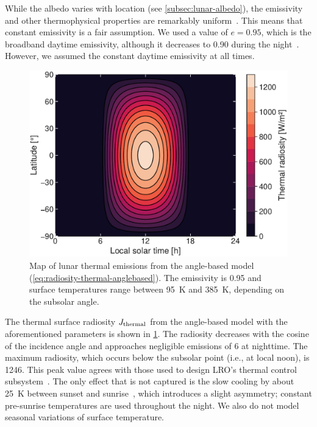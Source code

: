 While the albedo varies with location (see \cref{subsec:lunar-albedo}), the emissivity and other thermophysical properties are remarkably uniform~\cite{Hayne2017}. This means that constant emissivity is a fair assumption. We used a value of $e = 0.95$, which is the broadband daytime emissivity, although it decreases to 0.90 during the night~\cite{Bandfield2015}. However, we assumed the constant daytime emissivity at all times.

\begin{figure}[b]
    \centering
    \includegraphics[width=\linewidth]{figures/plots/thermal_map.pdf}
    \caption{Map of lunar thermal emissions from the angle-based model (\cref{eq:radiosity-thermal-anglebased}). The emissivity is 0.95 and surface temperatures range between \qty{95}{\K} and \qty{385}{\K}, depending on the subsolar angle.}
    \label{fig:thermal-map}
\end{figure}

The thermal surface radiosity $J_\textnormal{thermal}$ from the angle-based model with the aforementioned parameters is shown in \cref{fig:thermal-map}. The radiosity decreases with the cosine of the incidence angle and approaches negligible emissions of \qty{6}{\irr} at nighttime. The maximum radiosity, which occurs below the subsolar point (i.e., at local noon), is \qty{1246}{\irr}. This peak value agrees with those used to design \gls{LRO}'s thermal control subsystem~\cite{Tooley2010}. The only effect that is not captured is the slow cooling by about \qty{25}{\K} between sunset and sunrise~\cite{Vasavada2012}, which introduces a slight asymmetry; constant pre-sunrise temperatures are used throughout the night. We also do not model seasonal variations of surface temperature.






